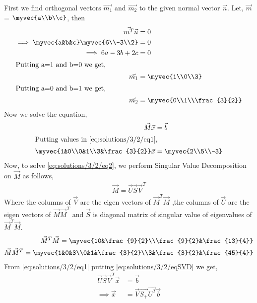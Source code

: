 
First we find orthogonal vectors $\vec{m_1}$ and $\vec{m_2}$ to the given normal vector $\vec{n}$. Let, $\vec{m}$ = $\myvec{a\\b\\c}$, then
\begin{align}
\vec{m^T}\vec{n} &= 0\\
\implies\myvec{a&b&c}\myvec{6\\-3\\2} &= 0\\
\implies6a-3b+2c &= 0\\
\intertext{Putting a=1 and b=0 we get,}
\vec{m_1} &= \myvec{1\\0\\3}\\
\intertext{Putting a=0 and b=1 we get,}
\vec{m_2} &= \myvec{0\\1\\\frac{3}{2}}
\end{align}
Now we solve the equation,
\begin{align}
\vec{M}\vec{x} &= \vec{b}\label{eq:solutions/3/2/eq1}\\
\intertext{Putting values in \eqref{eq:solutions/3/2/eq1},}
\myvec{1&0\\0&1\\3&\frac{3}{2}}\vec{x} &= \myvec{2\\5\\-3}\label{eq:solutions/3/2/eq2}
\end{align}
Now, to solve \eqref{eq:solutions/3/2/eq2}, we perform Singular Value Decomposition on $\vec{M}$ as follows,
\begin{align}
\vec{M}=\vec{U}\vec{S}\vec{V}^T\label{eq:solutions/3/2/eqSVD}
\end{align}
Where the columns of $\vec{V}$ are the eigen vectors of $\vec{M}^T\vec{M}$ ,the columns of $\vec{U}$ are the eigen vectors of $\vec{M}\vec{M}^T$ and $\vec{S}$ is diagonal matrix of singular value of eigenvalues of $\vec{M}^T\vec{M}$.
\begin{align}
\vec{M}^T\vec{M}=\myvec{10&\frac{9}{2}\\\frac{9}{2}&\frac{13}{4}}\label{eq:solutions/3/2/eqMTM}\\
\vec{M}\vec{M}^T=\myvec{1&0&3\\0&1&\frac{3}{2}\\3&\frac{3}{2}&\frac{45}{4}}
\end{align}
From \eqref{eq:solutions/3/2/eq1} putting \eqref{eq:solutions/3/2/eqSVD} we get,
\begin{align}
\vec{U}\vec{S}\vec{V}^T\vec{x} & = \vec{b}\\
\implies\vec{x} &= \vec{V}\vec{S_+}\vec{U^T}\vec{b}\label{eq:solutions/3/2/eqX}
\end{align}
